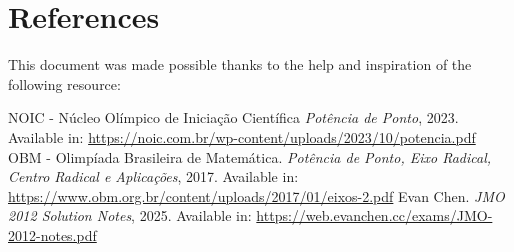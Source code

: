 \documentclass[12pt]{article}
\begin{document}
  \clearpage

  \section{\textsf{References}}
    This document was made possible thanks to the help and inspiration of the following resource:
    \renewcommand{\refname}{\vspace{-2em}}
    \begin{thebibliography}{9}
      NOIC - Núcleo Olímpico de Iniciação Científica
      \textit{Potência de Ponto}, 2023.
      Available in: \url{https://noic.com.br/wp-content/uploads/2023/10/potencia.pdf}
      OBM - Olimpíada Brasileira de Matemática.
      \textit{Potência de Ponto, Eixo Radical, Centro Radical e Aplicações}, 2017.
      Available in: \url{https://www.obm.org.br/content/uploads/2017/01/eixos-2.pdf}
      Evan Chen.
      \textit{JMO 2012 Solution Notes}, 2025.
      Available in: \url{https://web.evanchen.cc/exams/JMO-2012-notes.pdf}
    \end{thebibliography}
\end{document}
